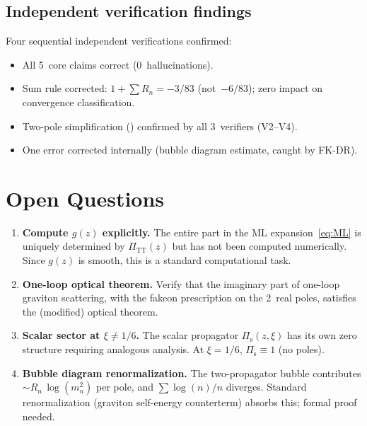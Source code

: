 \documentclass[11pt,a4paper]{article}
\newcommand{\PiTT}{\Pi_{\mathrm{TT}}}
\newcommand{\Pis}{\Pi_{\mathrm{s}}}
\begin{document}
\subsection{Independent verification findings}

Four sequential independent verifications confirmed:
\begin{itemize}[nosep]
  \item All 5~core claims correct (0~hallucinations).
  \item Sum rule corrected: $1 + \sum R_n = -3/83$ (not~$-6/83$);
    zero impact on convergence classification.
  \item Two-pole simplification () confirmed
    by all 3~verifiers (V2--V4).
  \item One error corrected internally (bubble diagram estimate,
    caught by FK-DR).
\end{itemize}


\section{Open Questions}
\label{sec:open}

\begin{enumerate}
  \item \textbf{Compute $g(z)$ explicitly.}  The entire part in the
    ML expansion~\eqref{eq:ML} is uniquely determined by $\PiTT(z)$
    but has not been computed numerically.  Since $g(z)$ is smooth, this
    is a standard computational task.

  \item \textbf{One-loop optical theorem.}  Verify that the imaginary
    part of one-loop graviton scattering, with the fakeon prescription
    on the 2~real poles, satisfies the (modified) optical theorem.

  \item \textbf{Scalar sector at $\xi \neq 1/6$.}  The scalar
    propagator $\Pis(z, \xi)$ has its own zero structure requiring
    analogous analysis.  At $\xi = 1/6$, $\Pis \equiv 1$ (no poles).

  \item \textbf{Bubble diagram renormalization.}  The two-propagator
    bubble contributes $\sim R_n\,\log(m_n^2)$ per pole, and
    $\sum \log(n)/n$ diverges.  Standard renormalization (graviton
    self-energy counterterm) absorbs this; formal proof needed.
\end{enumerate}
\end{document}

